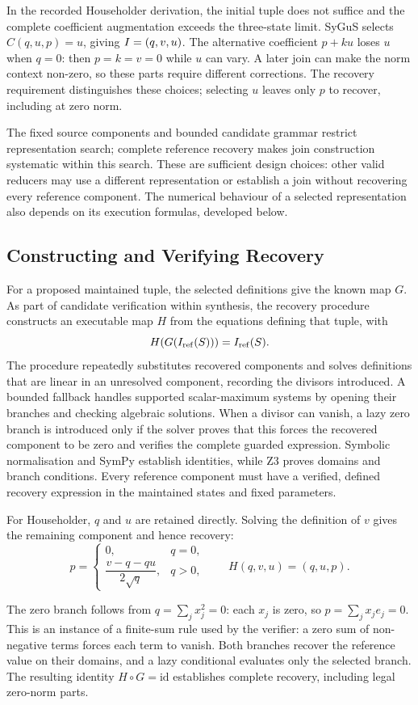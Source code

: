 In the recorded Householder derivation, the initial tuple does not suffice and the complete coefficient augmentation exceeds the three-state limit.
SyGuS selects $C(q,u,p)=u$, giving $I=(q,v,u)$.
The alternative coefficient $p+ku$ loses $u$ when $q=0$: then $p=k=v=0$ while $u$ can vary.
A later join can make the norm context non-zero, so these parts require different corrections.
The recovery requirement distinguishes these choices; selecting $u$ leaves only $p$ to recover, including at zero norm.
\finishwrapspace
\endgroup

The fixed source components and bounded candidate grammar restrict representation search; complete reference recovery makes join construction systematic within this search.
These are sufficient design choices: other valid reducers may use a different representation or establish a join without recovering every reference component.
The numerical behaviour of a selected representation also depends on its execution formulas, developed below.

\subsection{Constructing and Verifying Recovery}
\label{sec:atoms}
\label{sec:recovery}

For a proposed maintained tuple, the selected definitions give the known map $G$.
As part of candidate verification within synthesis, the recovery procedure constructs an executable map $H$ from the equations defining that tuple, with
\begin{equation}
\label{eq:recovery}
H(G(I_{\mathrm{ref}}(S)))=I_{\mathrm{ref}}(S).
\end{equation}
The procedure repeatedly substitutes recovered components and solves definitions that are linear in an unresolved component, recording the divisors introduced.
A bounded fallback handles supported scalar-maximum systems by opening their branches and checking algebraic solutions.
When a divisor can vanish, a lazy zero branch is introduced only if the solver proves that this forces the recovered component to be zero and verifies the complete guarded expression.
Symbolic normalisation and SymPy establish identities, while Z3 proves domains and branch conditions.
Every reference component must have a verified, defined recovery expression in the maintained states and fixed parameters.

For Householder, $q$ and $u$ are retained directly.
Solving the definition of $v$ gives the remaining component and hence recovery:
\[
p=
\begin{cases}
0,&q=0,\\[2pt]
\dfrac{v-q-qu}{2\sqrt q},&q>0,
\end{cases}
\qquad H(q,v,u)=(q,u,p).
\]

The zero branch follows from $q=\sum_jx_j^2=0$: each $x_j$ is zero, so $p=\sum_jx_je_j=0$.
This is an instance of a finite-sum rule used by the verifier: a zero sum of non-negative terms forces each term to vanish.
Both branches recover the reference value on their domains, and a lazy conditional evaluates only the selected branch.
The resulting identity $H\circ G=\mathrm{id}$ establishes complete recovery, including legal zero-norm parts.

